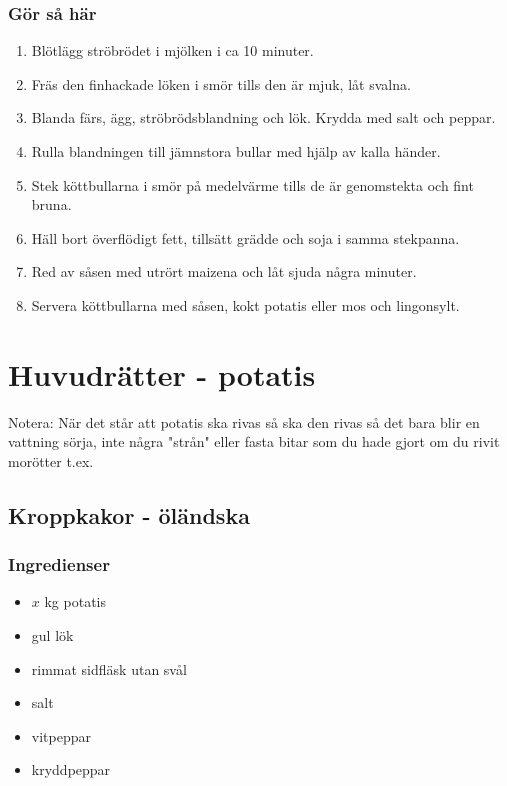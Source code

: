 \documentclass[a4paper,11pt,twocolumn]{article}
\begin{document}
\subsubsection*{Gör så här}
\begin{enumerate}[label=\arabic*.]
    \item Blötlägg ströbrödet i mjölken i ca 10 minuter.
    \item Fräs den finhackade löken i smör tills den är mjuk, låt svalna.
    \item Blanda färs, ägg, ströbrödsblandning och lök. Krydda med salt och peppar.
    \item Rulla blandningen till jämnstora bullar med hjälp av kalla händer.
    \item Stek köttbullarna i smör på medelvärme tills de är genomstekta och fint bruna.
    \item Häll bort överflödigt fett, tillsätt grädde och soja i samma stekpanna.
    \item Red av såsen med utrört maizena och låt sjuda några minuter.
    \item Servera köttbullarna med såsen, kokt potatis eller mos och lingonsylt.
\end{enumerate}

\newpage
\section{Huvudrätter - potatis}

Notera: När det står att potatis ska rivas så ska den rivas så det bara blir en vattning sörja, inte några "strån" eller fasta bitar som du hade gjort om du rivit morötter t.ex.

\subsection{Kroppkakor - öländska}
\subsubsection*{Ingredienser}
\begin{itemize}[noitemsep]
    \item $x$ kg potatis
    \item gul lök
    \item rimmat sidfläsk utan svål
    \item salt
    \item vitpeppar
    \item kryddpeppar
\end{itemize}
\end{document}
